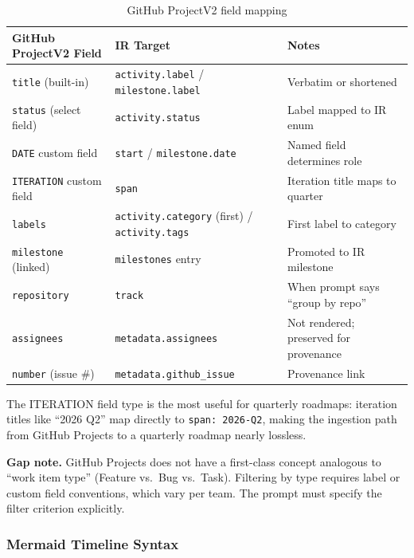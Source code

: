 \begin{table}[h]
\centering
\small
\begin{tabular}{lll}
\toprule
\textbf{GitHub ProjectV2 Field} & \textbf{IR Target} & \textbf{Notes} \\
\midrule
\texttt{title} (built-in) & \texttt{activity.label} / \texttt{milestone.label} & Verbatim or shortened \\
\texttt{status} (select field) & \texttt{activity.status} & Label mapped to IR enum \\
\texttt{DATE} custom field & \texttt{start} / \texttt{milestone.date} & Named field determines role \\
\texttt{ITERATION} custom field & \texttt{span} & Iteration title maps to quarter \\
\texttt{labels} & \texttt{activity.category} (first) / \texttt{activity.tags} & First label to category \\
\texttt{milestone} (linked) & \texttt{milestones} entry & Promoted to IR milestone \\
\texttt{repository} & \texttt{track} & When prompt says ``group by repo'' \\
\texttt{assignees} & \texttt{metadata.assignees} & Not rendered; preserved for provenance \\
\texttt{number} (issue \#) & \texttt{metadata.github\_issue} & Provenance link \\
\bottomrule
\end{tabular}
\caption{GitHub ProjectV2 field mapping}
\label{tab:github-field-mapping}
\end{table}

The ITERATION field type is the most useful for quarterly roadmaps: iteration titles
like ``2026 Q2'' map directly to \texttt{span: 2026-Q2}, making the ingestion path
from GitHub Projects to a quarterly roadmap nearly lossless.

\textbf{Gap note.} GitHub Projects does not have a first-class concept analogous to
``work item type'' (Feature vs.\ Bug vs.\ Task). Filtering by type requires label or
custom field conventions, which vary per team. The prompt must specify the filter
criterion explicitly.


\subsubsection{Mermaid Timeline Syntax}
\label{sec:ingest-mermaid}


